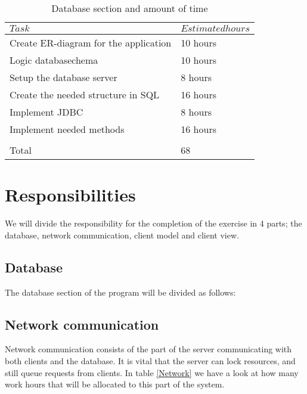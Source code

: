 \documentclass[a4paper, english, 12pt]{article}
\begin{document}
\begin{table}[h]
    \begin{center}
    \caption{Database section and amount of time} 
    \label{database}
    \vspace{0,5cm}
    \begin{tabular}{ll} \\ 
        \hline
        $Task$ & $Estimated hours$\\
        \hline 
    Create ER-diagram for the application & 10 hours\\
    Logic databasechema & 10 hours\\    
    Setup the database server & 8 hours\\
    Create the needed structure in SQL & 16 hours\\
    Implement JDBC & 8 hours\\
    Implement needed methods & 16 hours\\
    \hline \\
    Total & 68
        \hline
    \end{tabular}
    \end{center}
\end{table}

\section{Responsibilities}
We will divide the responsibility for the completion of the exercise in 4 parts; the database, network communication, 
client model and client view. 
\subsection{Database}
The database section of the program will be divided as follows:



\subsection{Network communication}
Network communication consists of the part of the server communicating with both clients and the database. It is vital that the server can lock resources, and still queue requests from clients. In table \ref{Network} we have a look at how many work hours that will be allocated to this part of the system.
\end{document}
